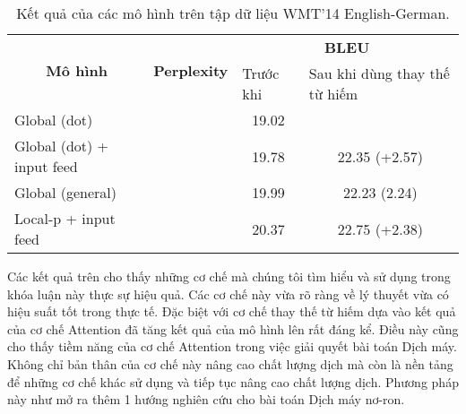 \begin{table}[]
	\centering
	\begin{tabular}{|l|l|c|c|} 
		\hline
		\multicolumn{1}{|c|}{\multirow{2}{*}{\textbf{Mô hình} }} & \multicolumn{1}{c|}{\multirow{2}{*}{\textbf{Perplexity} }} & \multicolumn{2}{c|}{\textbf{BLEU}}                                                   \\ 
		\cline{3-4}
		\multicolumn{1}{|c|}{}                                   & \multicolumn{1}{c|}{}                                      & \multicolumn{1}{l|}{Trước khi} & \multicolumn{1}{l|}{Sau khi dùng thay thế từ hiếm}  \\ 
		\hline
		Global (dot)                                             &                                                            & 19.02                          &                                                     \\ 
		\hline
		Global (dot) + input feed                                &                                                            & 19.78                          & 22.35 (+2.57)                                       \\ 
		\hline
		Global (general)                                         &                                                            & 19.99                          & 22.23 (2.24)                                        \\ 
		\hline
		Local-p + input feed                                     &                                                            & 20.37                          & 22.75 (+2.38)                                       \\
		\hline
	\end{tabular}
	\caption{Kết quả của các mô hình trên tập dữ liệu WMT'14 English-German.}
	\label{wmt14-results}
\end{table}

Các kết quả trên cho thấy những cơ chế mà chúng tôi tìm hiểu và sử dụng trong khóa luận này thực sự hiệu quả. Các cơ chế này vừa rõ ràng về lý thuyết vừa có hiệu suất tốt trong thực tế. Đặc biệt với cơ chế thay thế từ hiếm dựa vào kết quả của cơ chế Attention đã tăng kết quả của mô hình lên rất đáng kể. Điều này cũng cho thấy tiềm năng của cơ chế Attention trong việc giải quyết bài toán Dịch máy. Không chỉ bản thân của cơ chế này nâng cao chất lượng dịch mà còn là nền tảng để những cơ chế khác sử dụng và tiếp tục nâng cao chất lượng dịch. Phương pháp này như mở ra thêm 1 hướng nghiên cứu cho bài toán Dịch máy nơ-ron.

